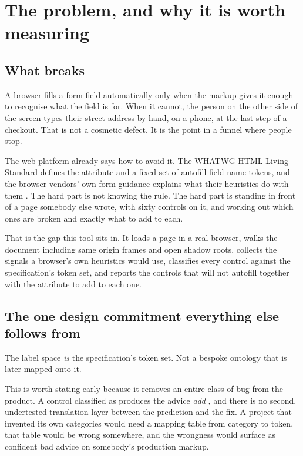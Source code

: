 \chapter{The problem, and why it is worth measuring}
\label{ch:problem}

\section{What breaks}

A browser fills a form field automatically only when the markup gives it enough
to recognise what the field is for. When it cannot, the person on the other side
of the screen types their street address by hand, on a phone, at the last step
of a checkout. That is not a cosmetic defect. It is the point in a funnel where
people stop.

The web platform already says how to avoid it. The WHATWG HTML Living Standard
defines the  attribute and a fixed set of autofill field name
tokens, and the browser vendors' own form guidance explains what their
heuristics do with them \cite{whatwg-autofill,webdev-forms,chrome-autofill}. The
hard part is not knowing the rule. The hard part is standing in front of a page
somebody else wrote, with sixty controls on it, and working out which ones are
broken and exactly what to add to each.

That is the gap this tool sits in. It loads a page in a real browser, walks the
document including same origin frames and open shadow roots, collects the
signals a browser's own heuristics would use, classifies every control against
the specification's token set, and reports the controls that will not autofill
together with the attribute to add to each one.

\section{The one design commitment everything else follows from}

The label space \emph{is} the specification's token set. Not a bespoke ontology
that is later mapped onto it.

This is worth stating early because it removes an entire class of bug from the
product. A control classified as  produces the advice
\emph{add} , and there is no second,
undertested translation layer between the prediction and the fix. A project that
invented its own categories would need a mapping table from category to token,
that table would be wrong somewhere, and the wrongness would surface as
confident bad advice on somebody's production markup.

